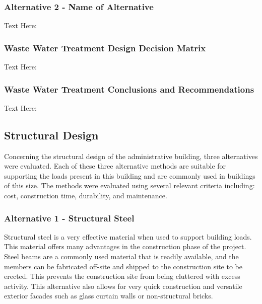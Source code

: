 \documentclass{ceri}
\begin{document}
\subsubsection{Alternative 2 - Name of Alternative}
Text Here:

\subsubsection{Waste Water Treatment Design Decision Matrix}
Text Here:

\begin{table}[H]
\centering
\caption{Waste Water Treatment Design Decision Matrix}
\label{my-label}
\end{table}

\subsubsection{Waste Water Treatment Conclusions and Recommendations}
Text Here:
\newpage
\subsection{Structural Design}
Concerning the structural design of the administrative building, three alternatives were evaluated. Each of these three alternative methods are suitable for supporting the loads present in this building and are commonly used in buildings of this size. The methods were evaluated using several relevant criteria including: cost, construction time, durability, and maintenance. 

\subsubsection{Alternative 1 - Structural Steel}
Structural steel is a very effective material when used to support building loads. This material offers many advantages in the construction phase of the project. Steel beams are a commonly used material that is readily available, and the members can be fabricated off-site and shipped to the construction site to be erected. This prevents the construction site from being cluttered with excess activity. This alternative also allows for very quick construction and versatile exterior facades such as glass curtain walls or non-structural bricks.
\end{document}
